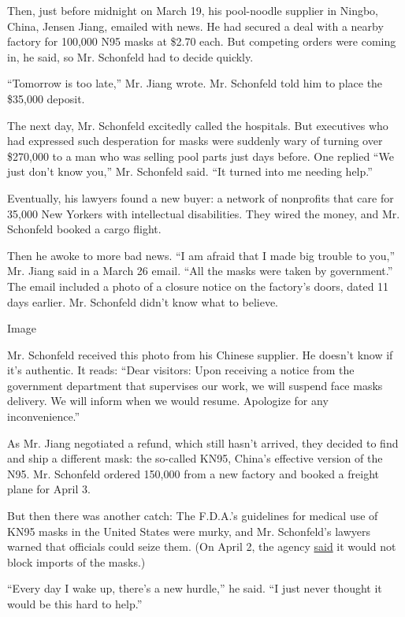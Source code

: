 Then, just before midnight on March 19, his pool-noodle supplier in
Ningbo, China, Jensen Jiang, emailed with news. He had secured a deal
with a nearby factory for 100,000 N95 masks at \$2.70 each. But
competing orders were coming in, he said, so Mr. Schonfeld had to decide
quickly.

``Tomorrow is too late,'' Mr. Jiang wrote. Mr. Schonfeld told him to
place the \$35,000 deposit.

The next day, Mr. Schonfeld excitedly called the hospitals. But
executives who had expressed such desperation for masks were suddenly
wary of turning over \$270,000 to a man who was selling pool parts just
days before. One replied ``We just don't know you,'' Mr. Schonfeld said.
``It turned into me needing help.''

Eventually, his lawyers found a new buyer: a network of nonprofits that
care for 35,000 New Yorkers with intellectual disabilities. They wired
the money, and Mr. Schonfeld booked a cargo flight.

Then he awoke to more bad news. ``I am afraid that I made big trouble to
you,'' Mr. Jiang said in a March 26 email. ``All the masks were taken by
government.'' The email included a photo of a closure notice on the
factory's doors, dated 11 days earlier. Mr. Schonfeld didn't know what
to believe.

Image

Mr. Schonfeld received this photo from his Chinese supplier. He doesn't
know if it's authentic. It reads: ``Dear visitors: Upon receiving a
notice from the government department that supervises our work, we will
suspend face masks delivery. We will inform when we would resume.
Apologize for any inconvenience.''

As Mr. Jiang negotiated a refund, which still hasn't arrived, they
decided to find and ship a different mask: the so-called KN95, China's
effective version of the N95. Mr. Schonfeld ordered 150,000 from a new
factory and booked a freight plane for April 3.

But then there was another catch: The F.D.A.'s guidelines for medical
use of KN95 masks in the United States were murky, and Mr. Schonfeld's
lawyers warned that officials could seize them. (On April 2, the agency
\href{https://www.buzzfeednews.com/article/kenbensinger/the-fda-now-says-it-will-allow-imports-of-kn95-masks-an}{said}
it would not block imports of the masks.)

``Every day I wake up, there's a new hurdle,'' he said. ``I just never
thought it would be this hard to help.''

